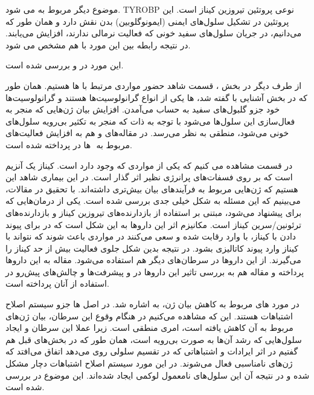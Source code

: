\documentclass[12pt]{article}
\begin{document}
موضوع دیگر مربوط به  می شود. TYROBP نوعی پروتئین تیروزین کیناز 
است. این پروتئین در تشکیل سلول‌های ایمنی (ایمونوگلوبین)‌ بدن نقش دارد و همان طور که می‌دانیم، در جریان  سلول‌های سفید خونی که فعالیت نرمالی ندارند، افزایش می‌یابند. در نتیجه رابطه بین این مورد با  هم مشخص می شود. 

این مورد در \cite{wikipedia2020}
  و  \cite{trombly}
   بررسی شده است.
   
   
   از طرف دیگر در بخش ،  قسمت  شاهد حضور مواردی مرتبط با  ها هستیم. همان طور که در بخش آشنایی با  گفته شد،  ها یکی از انواع گرانولوسیت‌ها هستند و گرانولوسیت‌ها خود جزو گلبول‌های سفید به حساب می‌آمدن. افزایش بیان ژن‌هایی که منجر به فعال‌سازی این سلول‌ها می‌شود با توجه به ذات  که منجر به تکثیر بی‌رویه سلول‌های خونی می‌شود، منطقی به نظر می‌رسد. در مقاله‌های \cite{lamble} و \cite{rosenblum} هم به افزایش فعالیت‌های مربوط به ‌ ها در  پرداخته شده است.
   
   
   در قسمت  مشاهده می کنیم که یکی از مواردی که وجود دارد  است. کیناز یک آنزیم است که بر روی فسفات‌های پرانرژی نظیر  اثر گذار است. در این بیماری شاهد این هستیم که ژن‌هایی مربوط به فرآیندهای  بیان ‌بیش‌تری داشته‌اند. با تحقیق در مقالات، می‌بینیم که این مسئله به شکل خیلی جدی بررسی شده است. یکی از درمان‌هایی که برای  پیشنهاد می‌شود، مبتنی بر استفاده از بازدارنده‌های تیروزین کیناز
   و بازدارنده‌های ترئونین/سرین کیناز
   است. مکانیزم اثر این داروها به این شکل است که در برای پیوند دادن با کیناز، با  وارد رقابت شده و سعی می‌کنند در مواردی باعث ‌شوند که  نتواند با کیناز وارد پیوند کاتالیزی بشود. در نتیجه بدین شکل جلوی فعالیت بیش از حد کیناز را می‌گیرند. از این دارو‌ها در سرطان‌های دیگر هم استفاده می‌شود. مقاله \cite{HARI2014628} به این دارو‌ها پرداخته و مقاله \cite{kinase} هم به بررسی تاثیر این دارو‌ها در  و پیشرفت‌ها و چالش‌های پیش‌رو در استفاده از آنان پرداخته است.
   
   
 
   در مورد  های مربوط به کاهش بیان ژن، به  اشاره شد. در اصل  ها جزو سیستم اصلاح اشتباهات  
    هستند. این که مشاهده‌ می‌کنیم در هنگام وقوع این سرطان، بیان ژن‌های مربوط به آن کاهش یافته است، امری منطقی است. زیرا عملا این سرطان و ایجاد سلول‌هایی که رشد‌ آن‌ها به صورت بی‌رویه است، همان طور که در بخش‌های قبل هم گفتیم در اثر ایرادات و اشتباهاتی که در تقسیم سلولی روی می‌دهد اتفاق می‌افتد که ژن‌های نامناسبی فعال می‌شوند. در این مورد سیستم اصلاح اشتباهات دچار مشکل شده و در نتیجه آن این سلول‌های نامعمول لوکمی ایجاد شده‌اند. این موضوع در \cite{carcin} بررسی شده است.
    
\end{document}
